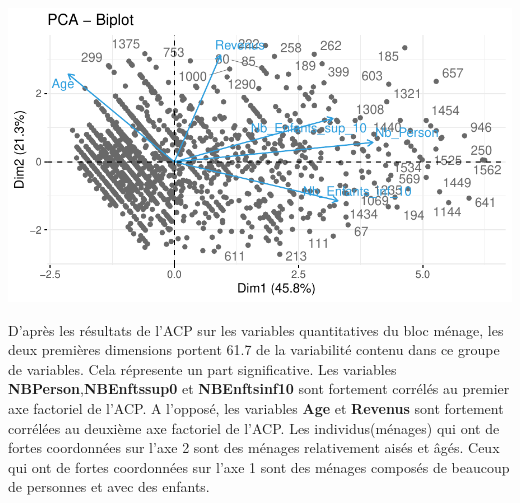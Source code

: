 \documentclass[11pt,a4paper, x11names]{article}\usepackage[]{graphicx}\usepackage[]{color}
\makeatletter
\def\maxwidth{ %
  \ifdim\Gin@nat@width>\linewidth
    \linewidth
  \else
    \Gin@nat@width
  \fi
}
\newenvironment{knitrout}{}{} %
\makeatother
\begin{document}
\begin{minipage}{0.49\linewidth}
\begin{mdframed}
\begin{knitrout}
\color{fgcolor}
\includegraphics[width=\maxwidth]{figure/unnamed-chunk-3-1} 
\end{knitrout}
\end{mdframed}
\end{minipage}

D'après les résultats de l'ACP sur les variables quantitatives du bloc ménage,
les deux premières dimensions portent 61.7 de la variabilité contenu dans ce groupe de variables. Cela répresente un part significative. Les variables \textbf{NBPerson},\textbf{NBEnftssup0} et \textbf{NBEnftsinf10} sont fortement corrélés au premier axe factoriel de l'ACP. A l'opposé, les variables  \textbf{Age} et \textbf{Revenus} sont fortement corrélées au deuxième axe factoriel de l'ACP. Les individus(ménages) qui ont de fortes coordonnées sur l'axe 2 sont des ménages relativement aisés et âgés. Ceux qui ont de fortes coordonnées sur l'axe 1 sont des ménages composés de beaucoup de personnes et avec des enfants.
\end{document}
